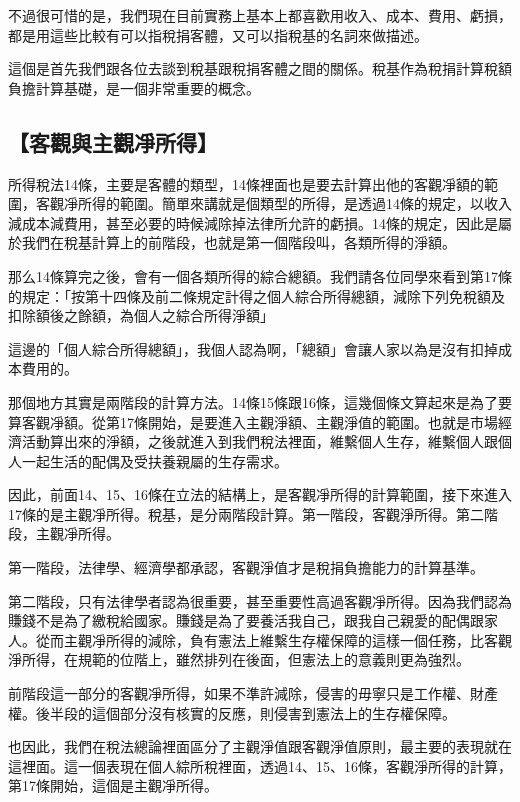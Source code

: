 \documentclass[oneside,sub3section]{ctexbook}
\begin{document}
不過很可惜的是，我們現在目前實務上基本上都喜歡用收入、成本、費用、虧損，都是用這些比較有可以指稅捐客體，又可以指稅基的名詞來做描述。

這個是首先我們跟各位去談到稅基跟稅捐客體之間的關係。稅基作為稅捐計算稅額負擔計算基礎，是一個非常重要的概念。

\hypertarget{ux5ba2ux89c0ux8207ux4e3bux89c0ux51c8ux6240ux5f97}{%
\subsection{【客觀與主觀凈所得】}\label{ux5ba2ux89c0ux8207ux4e3bux89c0ux51c8ux6240ux5f97}}

所得稅法14條，主要是客體的類型，14條裡面也是要去計算出他的客觀凈額的範圍，客觀凈所得的範圍。簡單來講就是個類型的所得，是透過14條的規定，以收入減成本減費用，甚至必要的時候減除掉法律所允許的虧損。14條的規定，因此是屬於我們在稅基計算上的前階段，也就是第一個階段叫，各類所得的淨額。

那么14條算完之後，會有一個各類所得的綜合總額。我們請各位同學來看到第17條的規定：「按第十四條及前二條規定計得之個人綜合所得總額，減除下列免稅額及扣除額後之餘額，為個人之綜合所得淨額」

這邊的「個人綜合所得總額」，我個人認為啊，「總額」會讓人家以為是沒有扣掉成本費用的。

那個地方其實是兩階段的計算方法。14條15條跟16條，這幾個條文算起來是為了要算客觀凈額。從第17條開始，是要進入主觀淨額、主觀淨值的範圍。也就是市場經濟活動算出來的淨額，之後就進入到我們稅法裡面，維繫個人生存，維繫個人跟個人一起生活的配偶及受扶養親屬的生存需求。

因此，前面14、15、16條在立法的結構上，是客觀凈所得的計算範圍，接下來進入17條的是主觀凈所得。稅基，是分兩階段計算。第一階段，客觀淨所得。第二階段，主觀凈所得。

第一階段，法律學、經濟學都承認，客觀淨值才是稅捐負擔能力的計算基準。

第二階段，只有法律學者認為很重要，甚至重要性高過客觀凈所得。因為我們認為賺錢不是為了繳稅給國家。賺錢是為了要養活我自己，跟我自己親愛的配偶跟家人。從而主觀凈所得的減除，負有憲法上維繫生存權保障的這樣一個任務，比客觀淨所得，在規範的位階上，雖然排列在後面，但憲法上的意義則更為強烈。

前階段這一部分的客觀凈所得，如果不準許減除，侵害的毋寧只是工作權、財產權。後半段的這個部分沒有核實的反應，則侵害到憲法上的生存權保障。

也因此，我們在稅法總論裡面區分了主觀淨值跟客觀淨值原則，最主要的表現就在這裡面。這一個表現在個人綜所稅裡面，透過14、15、16條，客觀淨所得的計算，第17條開始，這個是主觀凈所得。
\end{document}
